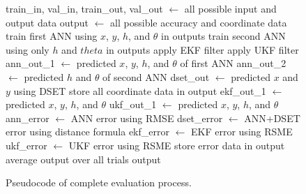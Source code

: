 \documentclass[12pt]{uthesis-v12}  %
\begin{document}
\begin{figure}
\begin{algorithmic}[1]
\STATE train\_in, val\_in, train\_out, val\_out $\leftarrow$ all possible input and output data
\STATE output $\leftarrow$ all possible accuracy and coordinate data
				\STATE train first ANN using $x$, $y$, $h$, and $\theta$ in outputs
				\STATE train second ANN using only $h$ and $theta$ in outputs
					\STATE apply EKF filter
					\STATE apply UKF filter
				\ENDFOR
					\STATE ann\_out\_1 $\leftarrow$ predicted $x$, $y$, $h$, and $\theta$ of first ANN
					\STATE ann\_out\_2 $\leftarrow$ predicted $h$ and $\theta$ of second ANN
						\STATE dset\_out $\leftarrow$ predicted $x$ and $y$ using DSET
						\STATE store all coordinate data in output
					\ENDFOR
					\STATE ekf\_out\_1 $\leftarrow$ predicted $x$, $y$, $h$, and $\theta$
					\STATE ukf\_out\_1 $\leftarrow$ predicted $x$, $y$, $h$, and $\theta$  
					\STATE ann\_error $\leftarrow$ ANN error using RMSE
					\STATE dset\_error $\leftarrow$ ANN+DSET error using distance formula
					\STATE ekf\_error $\leftarrow$ EKF error using RSME
					\STATE ukf\_error $\leftarrow$ UKF error using RSME
					\STATE store error data in output
				\ENDFOR
			\ENDFOR
		\ENDFOR
		\ENDFOR
	\ENDFOR
\ENDFOR
\STATE average output over all trials
\RETURN output
\label{full-alg1}
\end{algorithmic}
\caption{Pseudocode of complete evaluation process.} \label{full-alg}
\end{figure}		
\end{document}
